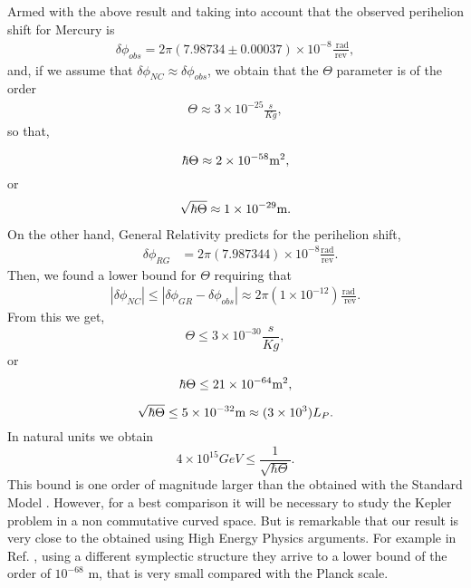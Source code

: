 \documentclass[a4paper,12pt]{article}
\begin{document}
Armed with the above result and taking into account that the
observed perihelion shift for Mercury is \cite{Pireaux:2001yk}
\begin{eqnarray}
\delta \phi_{obs}= 2\pi (7.98734\pm 0.00037) \times
10^{-8}\frac{\text{ rad}}{\text {rev}},
\end{eqnarray}
and, if we assume that $\delta \phi_{NC}\approx \delta
\phi_{obs}$, we obtain that the $\Theta$ parameter is of the order
\begin{eqnarray}
\Theta \approx 3\times 10^{-25}\frac{s}{Kg},
\end{eqnarray}
so that,

$$ \hbar \Theta \approx 2\times 10^{-58} {\text m}^2 ,$$ or
\begin{eqnarray}
\sqrt{\hbar \Theta} \approx 1\times 10^{-29} {\text m}.
\end{eqnarray}On the
other hand, General Relativity predicts for the perihelion shift,
\begin{eqnarray}
&\delta \phi_{RG} &= 2\pi (7.987344) \times 10^{-8}\frac{\text{
rad}}{\text {rev}}.
\end{eqnarray}
Then, we found a lower bound for $\Theta$ requiring that
\begin{eqnarray}
|\delta \phi_{NC}| \leq |\delta \phi_{GR} -\delta
\phi_{obs}|\approx 2\pi (1\times 10^{-12})
\frac{\text{rad}}{\text{ rev}}. \label{eq:cota}
\end{eqnarray}
From this we get,
$$\Theta \leq  3 \times 10^{-30} \frac{s}{Kg},$$
or
$$\hbar \Theta \leq 21 \times 10^{-64} {\text m}^{2},$$

$$\sqrt {\hbar \Theta }\leq 5 \times 10^{-32}{\text m} \approx (3\times 10^{3}) L_{P}.$$
In natural units we obtain
$$
4\times 10^{15} GeV \leq \frac{1}{\sqrt {\hbar \Theta }}.$$ This
bound is one order of magnitude larger than the obtained with the
Standard Model \cite{chaichian:gnus}. However, for a best
comparison it will be necessary to study  the Kepler problem in a
non commutative curved space. But is remarkable that our result is
very close to the obtained using High Energy Physics arguments.
For example in Ref. \cite{minic:gnus}, using a different
symplectic structure they arrive to a lower bound of the order of
$10^{-68}$ m,
 that is very small compared with the Planck scale.\\
\end{document}
